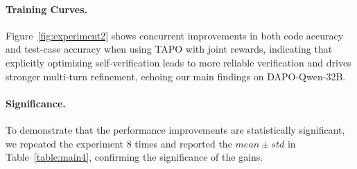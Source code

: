 \documentclass{article} %
\begin{document}
\paragraph{Training Curves.}
Figure~\ref{fig:experiment2} shows concurrent improvements in both code accuracy and test-case accuracy when using TAPO with joint rewards, indicating that explicitly optimizing self-verification leads to more reliable verification and drives stronger multi-turn refinement, echoing our main findings on DAPO-Qwen-32B.


\paragraph{Significance.}
To demonstrate that the performance improvements are statistically significant, we repeated the experiment 8 times and reported the $mean\pm std$ in Table~\ref{table:main4}, confirming the significance of the gains.

\end{document}

